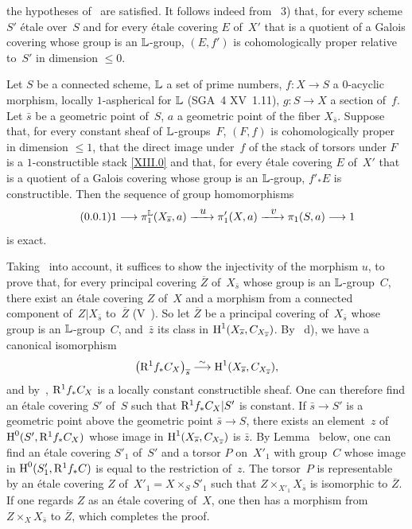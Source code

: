 the hypotheses of~ are satisfied. It follows
indeed from~ 3) that, for every scheme $S'$
\'etale over~$S$ and for every \'etale covering $E$ of~$X'$
that is a quotient of a Galois covering whose group is an $\mathbb{L}$-group,
$(E,f')$ is cohomologically proper relative to~$S'$ in
dimension $\leqslant 0$.
\begin{proposition}
\label{XIII.4.3}
Let $S$ be a connected scheme, $\mathbb{L}$ a set of prime
numbers, $f\colon X\to S$ a $0$-acyclic morphism, locally
$1$-aspherical for $\mathbb{L}$ \textup{(SGA~4 XV~1.11)}, $g\colon S\to X$ a
section of~$f$. Let $\bar{s}$ be a geometric point of~$S$,
$a$ a geometric point of the fiber $X_{\bar{s}}$. Suppose
that, for every constant sheaf of
$\mathbb{L}$-groups~$F$, $(F,f)$ is cohomologically proper in dimension
$\leqslant1$, that the direct image under~$f$ of the stack of torsors under
$F$ is a $1$-constructible stack \eqref{XIII.0} and that, for every
\'etale covering $E$ of~$X'$ that is a quotient of a Galois
covering whose group is an $\mathbb{L}$-group, $f'_*E$ is constructible. Then
the sequence of group homomorphisms
\begin{equation*}
\label{eq:XIII.4.3.1}
\tag{\thesubsection.1}
1\to\pi_1^{\LL}(X_{\bar{s}},a)\lto{u} \pi_1'(X,a)\lto{v}\pi_1(S,a)\to1
\end{equation*}
is exact.
\end{proposition}

Taking~ into account, it suffices to show the injectivity
of the morphism $u$, \ie to prove that, for every principal
covering $\overline{Z}$ of~$X_{\bar{s}}$
whose group is an $\mathbb{L}$-group~$C$, there exist an \'etale covering
$Z$ of~$X$ and a morphism from a connected component of~$Z|X_{\bar{s}}$
to~$\overline{Z}$ (V~). So let $\overline{Z}$ be a
principal covering of~$X_{\bar{s}}$ whose group is an $\mathbb{L}$-group~$C$, and~$\bar{z}$ its class in
$\operatorname{H}^1(X_{\overline{s}},C_{X_{\overline{s}}})$. By ~d), we
have a canonical isomorphism
$$
\left(\mathrm{R}^1f_*C_X\right)_{\overline{s}}\overset{\sim}{\longrightarrow}\operatorname{H}^1(X_{\overline{s}},C_{X_{\overline{s}}}),
$$
and by~, $\mathrm{R}^1f_*C_X$ is a locally constant
constructible sheaf. One can therefore find an
\'etale covering $S'$ of~$S$ such that $\mathrm{R}^1f_*C_X|S'$ is
constant. If $\bar{s}\to S'$ is a geometric point
above the geometric point $\bar{s}\to S$, there exists an
element~$z$ of~$\operatorname{H}^0(S', \mathrm{R}^1f_*C_X)$ whose image in
$\operatorname{H}^1(X_{\overline{s}},C_{X_{\overline{s}}})$ is $\bar{z}$. By
Lemma~ below, one can find an \'etale
covering $S'_1$ of~$S'$ and a torsor $P$ on~$X'_1$ with group~$C$
whose image in $\operatorname{H}^0(S'_1,\mathrm{R}^1f_*C)$ is equal to the
restriction of~$z$. The torsor~$P$ is representable by an
\'etale covering $Z$ of~$X'_1=X\times_SS'_1$ such that
$Z\times_{X'_1}X_{\bar{s}}$ is isomorphic to $\overline{Z}$. If
one regards $Z$ as an \'etale covering of~$X$, one
then has a morphism from~$Z\times_XX_{\bar{s}}$ to $\overline{Z}$, which
completes the proof.

